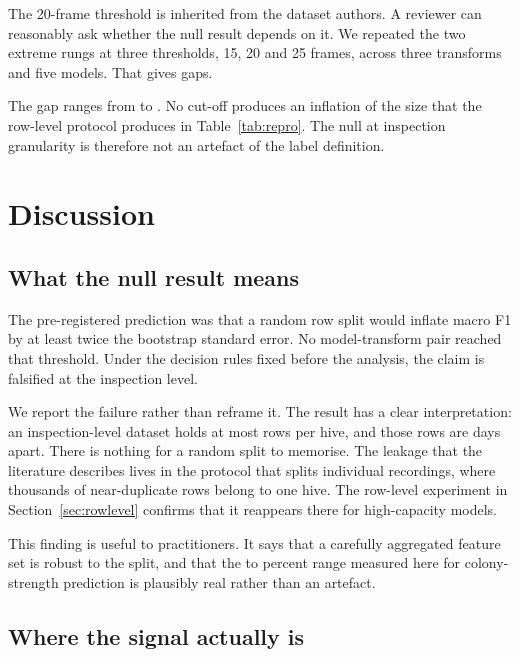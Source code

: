 ﻿\documentclass[review,12pt]{elsarticle}
\begin{document}
The 20-frame threshold is inherited from the dataset authors.
A reviewer can reasonably ask whether the null result depends on it.
We repeated the two extreme rungs at three thresholds, 15, 20 and 25 frames,
across three transforms and five models.
That gives \LeakThreshNCombinations{} gaps.

The gap ranges from \LeakThreshAllGapMin{} to \LeakThreshAllGapMax{}.
No cut-off produces an inflation of the size that the row-level protocol
produces in Table~\ref{tab:repro}.
The null at inspection granularity is therefore not an artefact of the label
definition.

\section{Discussion}
\label{sec:discussion}

\subsection{What the null result means}

The pre-registered prediction was that a random row split would inflate macro
F1 by at least twice the bootstrap standard error.
No model-transform pair reached that threshold.
Under the decision rules fixed before the analysis, the claim is falsified at
the inspection level.

We report the failure rather than reframe it.
The result has a clear interpretation: an inspection-level dataset holds at most
\LeakMaxInspectionsPerHive{} rows per hive, and those rows are
\LeakMedianGapDays{} days apart.
There is nothing for a random split to memorise.
The leakage that the literature describes lives in the protocol that splits
individual recordings, where thousands of near-duplicate rows belong to one
hive.
The row-level experiment in Section~\ref{sec:rowlevel} confirms that it
reappears there for high-capacity models.

This finding is useful to practitioners.
It says that a carefully aggregated feature set is robust to the split, and
that the \LeakBandsPtwoHistGradientBoostingMacroFonePct{} to
\LeakBandsEnvPtwoHistGradientBoostingMacroFonePct{} percent range measured here
for colony-strength prediction is plausibly real rather than an artefact.

\subsection{Where the signal actually is}
\end{document}
